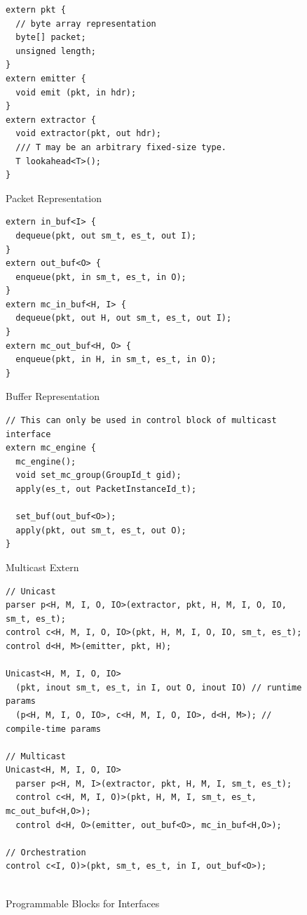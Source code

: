 \begin{figure}[ht]
\begin{lstlisting}[frame=none]
extern pkt {
  // byte array representation
  byte[] packet;
  unsigned length;
}
extern emitter {
  void emit (pkt, in hdr);
}
extern extractor {
  void extractor(pkt, out hdr);
  /// T may be an arbitrary fixed-size type.
  T lookahead<T>();
}
\end{lstlisting}
\caption{Packet Representation}
\label{fig:pkt-externs}
\end{figure}
\begin{figure}[ht]
\begin{lstlisting}[frame=none]
extern in_buf<I> {
  dequeue(pkt, out sm_t, es_t, out I);
}
extern out_buf<O> {
  enqueue(pkt, in sm_t, es_t, in O);
}
extern mc_in_buf<H, I> {
  dequeue(pkt, out H, out sm_t, es_t, out I);
}
extern mc_out_buf<H, O> {
  enqueue(pkt, in H, in sm_t, es_t, in O);
}
\end{lstlisting}
\caption{Buffer Representation}
\label{fig:pkt-buf}
\end{figure}
\begin{figure}[ht]
\begin{lstlisting}[frame=none]
// This can only be used in control block of multicast interface
extern mc_engine {
  mc_engine();
  void set_mc_group(GroupId_t gid);
  apply(es_t, out PacketInstanceId_t);
  
  set_buf(out_buf<O>);
  apply(pkt, out sm_t, es_t, out O);  
}
\end{lstlisting}
\caption{Multicast Extern}
\label{fig:msa-multicast-extern}
\end{figure}
\begin{figure}[H]
\begin{lstlisting}[frame=none]
// Unicast
parser p<H, M, I, O, IO>(extractor, pkt, H, M, I, O, IO, sm_t, es_t);
control c<H, M, I, O, IO>(pkt, H, M, I, O, IO, sm_t, es_t);
control d<H, M>(emitter, pkt, H);

Unicast<H, M, I, O, IO>
  (pkt, inout sm_t, es_t, in I, out O, inout IO) // runtime params
  (p<H, M, I, O, IO>, c<H, M, I, O, IO>, d<H, M>); // compile-time params

// Multicast
Unicast<H, M, I, O, IO> 
  parser p<H, M, I>(extractor, pkt, H, M, I, sm_t, es_t);
  control c<H, M, I, O)>(pkt, H, M, I, sm_t, es_t, mc_out_buf<H,O>);
  control d<H, O>(emitter, out_buf<O>, mc_in_buf<H,O>);

// Orchestration
control c<I, O)>(pkt, sm_t, es_t, in I, out_buf<O>);
    
\end{lstlisting}
\caption{Programmable Blocks for Interfaces}
\label{fig:programmable-blocks-for-interfaces}
\end{figure}

